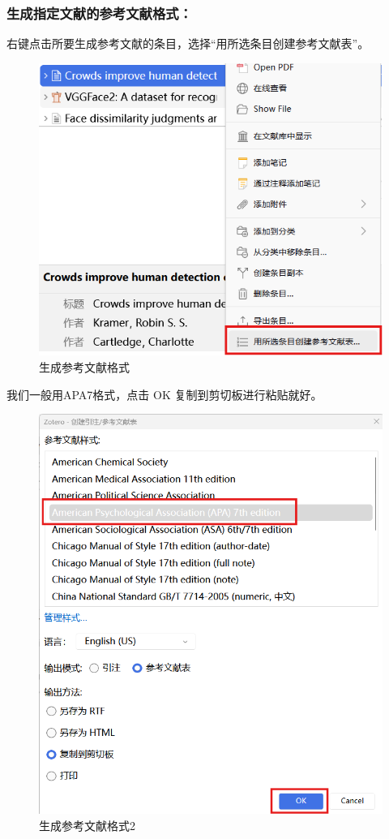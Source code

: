 \documentclass[]{ctexbook}
\theoremstyle{definition}
\theoremstyle{definition}
\theoremstyle{definition}
\theoremstyle{definition}
\theoremstyle{remark}
\begin{document}
\subsubsection{生成指定文献的参考文献格式：}\label{ux751fux6210ux6307ux5b9aux6587ux732eux7684ux53c2ux8003ux6587ux732eux683cux5f0f}

右键点击所要生成参考文献的条目，选择``用所选条目创建参考文献表''。

\begin{figure}

{\centering \includegraphics[width=0.7\linewidth]{img/zotero/zotero_reference_taxt_1} 

}

\caption{生成参考文献格式}\label{fig:zotero-reference-taxt-1}
\end{figure}

我们一般用APA7格式，点击 OK 复制到剪切板进行粘贴就好。

\begin{figure}

{\centering \includegraphics[width=0.7\linewidth]{img/zotero/zotero_reference_taxt_2} 

}

\caption{生成参考文献格式2}\label{fig:zotero-reference-taxt-2}
\end{figure}
\end{document}
